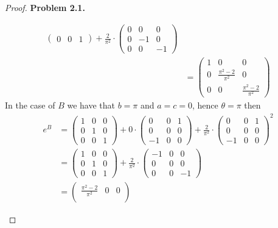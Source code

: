 \documentclass[11pt]{article}
\theoremstyle{definition}
\begin{document}
\begin{proof}{\textbf{Problem 2.1.}}
\begin{itemize}
\begin{align*}
\begin{pmatrix}
            0 & 0 & 1
        \end{pmatrix}
        + \frac{2}{\pi^2} \cdot \begin{pmatrix}
            0 & 0 & 0\\
            0 & -1 & 0\\
            0 & 0 & -1
        \end{pmatrix}\\
        &= \begin{pmatrix}
            1 & 0 & 0\\
            0 & \frac{\pi^2 - 2}{\pi^2} & 0\\
            0 & 0 & \frac{\pi^2 - 2}{\pi^2}
        \end{pmatrix}  
    \end{align*}
    In the case of $B$ we have that $b = \pi$ and $a = c = 0$, hence
    $\theta = \pi$ then
    \begin{align*}
        e^B &= \begin{pmatrix}
            1 & 0 & 0\\
            0 & 1 & 0\\
            0 & 0 & 1
        \end{pmatrix}
        + 0 \cdot \begin{pmatrix}
            0 & 0 & 1\\
            0 & 0 & 0\\
            -1 & 0 & 0
        \end{pmatrix}
        + \frac{2}{\pi^2} \cdot \begin{pmatrix}
            0 & 0 & 1\\
            0 & 0 & 0\\
            -1 & 0 & 0
        \end{pmatrix}^2\\
        &= \begin{pmatrix}
            1 & 0 & 0\\
            0 & 1 & 0\\
            0 & 0 & 1
        \end{pmatrix}
        + \frac{2}{\pi^2} \cdot \begin{pmatrix}
            -1 & 0 & 0\\
            0 & 0 & 0\\
            0 & 0 & -1
        \end{pmatrix}\\
        &= \begin{pmatrix}
            \frac{\pi^2 - 2}{\pi^2} & 0 & 0\\

\end{pmatrix}
\end{align*}
\end{itemize}
\end{proof}
\end{document}
